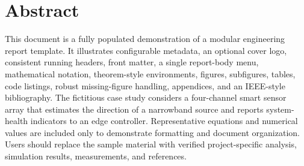 \chapter*{Abstract}

This document is a fully populated demonstration of a modular engineering report template.
It illustrates configurable metadata, an optional cover logo, consistent running headers,
front matter, a single report-body menu, mathematical notation, theorem-style environments,
figures, subfigures, tables, code listings, robust missing-figure handling, appendices, and an
IEEE-style bibliography. The fictitious case study considers a four-channel smart sensor array
that estimates the direction of a narrowband source and reports system-health indicators to an
edge controller. Representative equations and numerical values are included only to demonstrate
formatting and document organization. Users should replace the sample material with verified
project-specific analysis, simulation results, measurements, and references.
